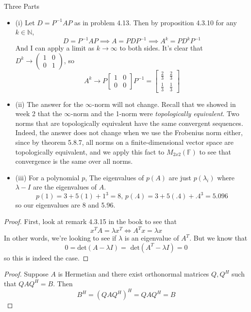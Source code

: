\documentclass[12pt]{amsart}
\newenvironment{problem}[2][Problem]{\begin{trivlist}
\item[\hskip \labelsep {\bfseries #1}\hskip \labelsep {\bfseries #2.}]}{\end{trivlist}}
\begin{document}
\begin{problem}{16} Three Parts
\begin{itemize}
\item (i)
Let $D = P^{-1}AP$ as in problem 4.13. Then by proposition 4.3.10 for any $k \in \mathbb{N}$,
$$
D = P^{-1}AP \implies A = PDP^{-1} \implies A^k = PD^kP^{-1}
$$
And I can apply a limit as $k \to \infty$ to both sides. It's clear that $D^k \to ( \begin{smallmatrix} 1 & 0 \\ 0 & 1 \end{smallmatrix} )$, so
$$
A^k \to P \begin{bmatrix}
1 & 0 \\
0 & 0
\end{bmatrix} P^{-1} = \begin{bmatrix}
\frac{2}{3} & \frac{2}{3} \\
\frac{1}{3} & \frac{1}{3}
\end{bmatrix}
$$
\item (ii)
The answer for the $\infty$-norm will not change. Recall that we showed in week 2 that the $\infty$-norm and the 1-norm were \textit{topologically equivalent}. Two norms that are topologically equivalent have the same convergent sequences. Indeed, the answer does not change when we use the Frobenius norm either, since by theorem 5.8.7, all norms on a finite-dimensional vector space are topologically equivalent, and we apply this fact to $M_{2x2}(\mathbb{F})$ to see that convergence is the same over all norms.
\item (iii)
For a polynomial $p$, The eigenvalues of $p(A)$ are just $p(\lambda_i)$ where $\lambda-I$ are the eigenvalues of $A$.
$$
p(1) = 3 + 5(1) + 1^3 = 8\text{,  } p(.4) = 3 + 5(.4) +.4^3 = 5.096
$$
so our eigenvalues are 8 and 5.96.
\end{itemize}
\end{problem}

\begin{problem}{18}
\begin{proof}
First, look at remark 4.3.15 in the book to see that
$$x^TA = \lambda x^T \iff A^Tx = \lambda x$$
In other words, we're looking to see if $\lambda$ is an eigenvalue of $A^T$. But we know that
$$0 = \text{det}(A - \lambda I) = \text{ det}(A^T - \lambda I) = 0 $$
so this is indeed the case.
\end{proof}
\end{problem}

\begin{problem}{20}
\begin{proof}
Suppose $A$ is Hermetian and there exist orthonormal matrices $Q, Q^H$ such that $QAQ^H = B$. Then
$$B^H = (QAQ^H)^H = QAQ^H = B$$
\end{proof}
\end{problem}
\end{document}
